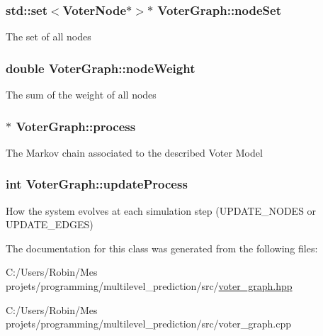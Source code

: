 \subsubsection[{node\+Set}]{\setlength{\rightskip}{0pt plus 5cm}std\+::set$<${\bf Voter\+Node}$\ast$$>$$\ast$ Voter\+Graph\+::node\+Set}\label{class_voter_graph_ab4c1bdbd12ebccd735841471984dfeec}
The set of all nodes \hypertarget{class_voter_graph_a8108f0b182d1ca41ef567f7b729fe749}{}
\subsubsection[{node\+Weight}]{\setlength{\rightskip}{0pt plus 5cm}double Voter\+Graph\+::node\+Weight}\label{class_voter_graph_a8108f0b182d1ca41ef567f7b729fe749}
The sum of the weight of all nodes \hypertarget{class_voter_graph_a94b668c67f423d3a4ce25d5605a467cb}{}
\subsubsection[{process}]{$\ast$ Voter\+Graph\+::process}\label{class_voter_graph_a94b668c67f423d3a4ce25d5605a467cb}
The Markov chain associated to the described Voter Model \hypertarget{class_voter_graph_a11db0ef474064d44adb3ea22df8199ee}{}
\subsubsection[{update\+Process}]{\setlength{\rightskip}{0pt plus 5cm}int Voter\+Graph\+::update\+Process}\label{class_voter_graph_a11db0ef474064d44adb3ea22df8199ee}
How the system evolves at each simulation step (U\+P\+D\+A\+T\+E\+\_\+\+N\+O\+D\+E\+S or U\+P\+D\+A\+T\+E\+\_\+\+E\+D\+G\+E\+S) 

The documentation for this class was generated from the following files\+:\begin{DoxyCompactItemize}
\item 
C\+:/\+Users/\+Robin/\+Mes projets/programming/multilevel\+\_\+prediction/src/\hyperlink{voter__graph_8hpp}{voter\+\_\+graph.\+hpp}\item 
C\+:/\+Users/\+Robin/\+Mes projets/programming/multilevel\+\_\+prediction/src/voter\+\_\+graph.\+cpp\end{DoxyCompactItemize}
